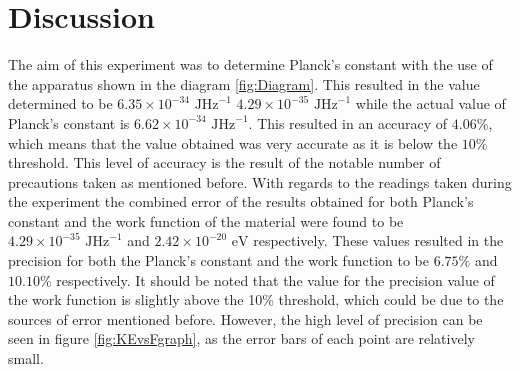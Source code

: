 \documentclass[12pt, a4paper]{article}
\begin{document}
\section*{Discussion}
The aim of this experiment was to determine Planck's constant with the use of the apparatus shown in the diagram \ref{fig:Diagram}. This resulted in the value determined to be $6.35\times10^{-34} \text{ JHz}^{-1}$ \textpm $4.29\times 10^{-35}\text{ JHz}^{-1}$ while the actual value of Planck's constant is $6.62\times10^{-34} \text{ JHz}^{-1}$. This resulted in an accuracy of $4.06\%$, which means that the value obtained was very accurate as it is below the $10\%$ threshold. This level of accuracy is the result of the notable number of precautions taken as mentioned before. With regards to the readings taken during the experiment the combined error of the results obtained for both Planck's constant and the work function of the material were found to be \textpm $4.29\times10^{-35} \text{ JHz}^{-1}$ and \textpm $2.42\times10^{-20} \text{ eV}$ respectively. These values resulted in the precision for both the Planck's constant and the work function to be $6.75\%$ and $10.10\%$ respectively. It should be noted that the value for the precision value of the work function is slightly above the 10\% threshold, which could be due to the sources of error mentioned before. However, the high level of precision can be seen in figure \ref{fig:KEvsFgraph}, as the error bars of each point are relatively small. 
\end{document}
